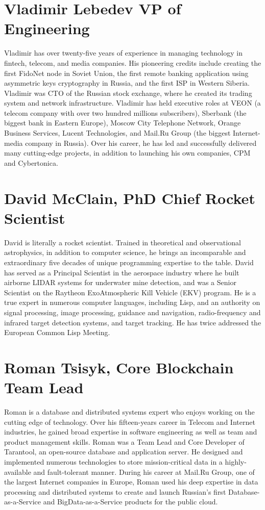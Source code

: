\documentclass[8pt,fleqn,openany]{book}
\begin{document}
\section{Vladimir Lebedev VP of Engineering}
Vladimir has over twenty-five years of experience in managing technology in fintech, telecom, and media companies. His pioneering credits include creating the first FidoNet node in Soviet Union, the first remote banking application using asymmetric keys cryptography in Russia, and the first ISP in Western Siberia. Vladimir was CTO of the Russian stock exchange, where he created its trading system and network infrastructure. Vladimir has held executive roles at VEON (a telecom company with over two hundred millions subscribers), Sberbank (the biggest bank in Eastern Europe), Moscow City Telephone Network, Orange Business Services, Lucent Technologies, and Mail.Ru Group (the biggest Internet-media company in Russia). Over his career, he has led and successfully delivered many cutting-edge projects, in addition to launching his own companies, CPM and Cybertonica. 

\section{David McClain, PhD Chief Rocket Scientist}
David is literally a rocket scientist. Trained in theoretical and observational astrophysics, in addition to computer science, he brings an incomparable and extraordinary five decades of unique programming expertise to the table. David has served as a Principal Scientist in the aerospace industry where he built airborne LIDAR systems for underwater mine detection, and was a Senior Scientist on the Raytheon ExoAtmospheric Kill Vehicle (EKV) program. He is a true expert in numerous computer languages, including Lisp, and an authority on signal processing, image processing, guidance and navigation, radio-frequency and infrared target detection systems, and target tracking. He has twice addressed the European Common Lisp Meeting. 

\section{Roman Tsisyk, Core Blockchain Team Lead}
Roman is a database and distributed systems expert who enjoys working on the cutting edge of technology. Over his fifteen-years career in Telecom and Internet industries, he gained broad expertise in software engineering as well as team and product management skills. Roman was a Team Lead and Core Developer of Tarantool, an open-source database and application server. He designed and implemented numerous technologies to store mission-critical data in a highly-available and fault-tolerant manner. During his career at Mail.Ru Group, one of the largest Internet companies in Europe, Roman used his deep expertise in data processing and distributed systems to create and launch Russian’s first Database-as-a-Service and BigData-as-a-Service products for the public cloud. 
\end{document}
